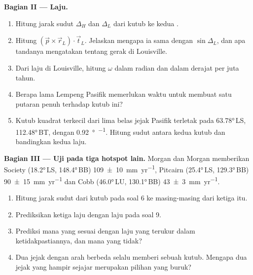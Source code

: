 \begin{problem}
\medskip
\noindent\textbf{Bagian II --- Laju.}
\begin{enumerate}[resume]
  \item Hitung jarak sudut $\Delta_H$ dan $\Delta_L$ dari kutub ke kedua .
  \item Hitung $(\vec p\times\vec r_L)\cdot\vec t_L$. Jelaskan mengapa ia sama dengan $\sin\Delta_L$, dan apa tandanya mengatakan tentang gerak di Louisville.
  \item Dari laju di Louisville, hitung $\omega$ dalam radian dan dalam derajat per juta tahun.
  \item Berapa lama Lempeng Pasifik memerlukan waktu untuk membuat satu putaran penuh terhadap kutub ini?
  \item Kutub kuadrat terkecil dari lima belas jejak Pasifik terletak pada \ang{63.78}\,LS, \ang{112.48}\,BT, dengan \qty{0.92}{\degree\per\Ma}. Hitung sudut antara kedua kutub dan bandingkan kedua laju.
\end{enumerate}

\medskip
\noindent\textbf{Bagian III --- Uji pada tiga hotspot lain.} Morgan dan Morgan memberikan  Society (\ang{18.2}\,LS, \ang{148.4}\,BB)
\qty[uncertainty-mode=separate]{109 \pm 10}{mm.yr^{-1}}, Pitcairn
(\ang{25.4}\,LS, \ang{129.3}\,BB)
\qty[uncertainty-mode=separate]{90 \pm 15}{mm.yr^{-1}} dan Cobb
(\ang{46.0}\,LU, \ang{130.1}\,BB)
\qty[uncertainty-mode=separate]{43 \pm 3}{mm.yr^{-1}}.
\begin{enumerate}[resume]
  \item Hitung jarak sudut dari kutub pada soal 6 ke masing-masing dari ketiga  itu.
  \item Prediksikan ketiga laju dengan laju pada soal 9.
  \item Prediksi mana yang sesuai dengan laju yang terukur dalam ketidakpastiannya, dan mana yang tidak?
  \item Dua jejak dengan arah berbeda selalu memberi sebuah kutub. Mengapa dua jejak yang hampir sejajar merupakan pilihan yang buruk?
\end{enumerate}


\end{problem}
